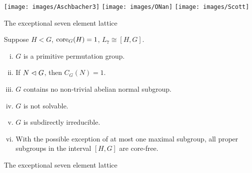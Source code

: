 \documentclass[xcolor=dvipsnames,11pt,hide notes]{beamer}
\theoremstyle{definition}
\theoremstyle{remark}
\numberwithin{theorem}{section}
\numberwithin{claim}{section}
\numberwithin{equation}{section}
\numberwithin{conjecture}{section}
\begin{document}
\begin{frame}[fragile,label=AOS]{}
\begin{center}
\texttt{[image: images/Aschbacher3]}
\hskip2mm
\texttt{[image: images/ONan]}
\hskip2mm
\texttt{[image: images/Scott]}
 \end{center}

\end{frame}



\begin{frame}[fragile,label=Example7elementPreziOld,shrink=5]{The exceptional seven element lattice}
    \begin{theorem}
      \label{thm:except-seven-elem}
      Suppose $H<G$, \hskip2mm $\mathrm{core}_G(H) = 1$, \hskip2mm $L_7 \cong [H,G]$.
      \begin{enumerate}[(i)]
      \item<1-> $G$ is a primitive permutation group.
      \item<1-> If $N\vartriangleleft G$, then $C_G(N) = 1$.
      \item<1-> $G$ contains no non-trivial abelian normal subgroup.
      \item<1-> $G$ is not solvable.
      \item<1-> $G$ is subdirectly irreducible.
      \item<1-> With the possible exception of at most one maximal subgroup, %
        all proper subgroups in the interval $[H,G]$ are core-free. 
      \end{enumerate}
    \end{theorem}
\end{frame}


\begin{frame}[fragile,label=Example7elementPreziBigFig]{The exceptional seven element lattice}
      \begin{center}
    {
}
      \end{center}
\end{frame}
\end{document}
